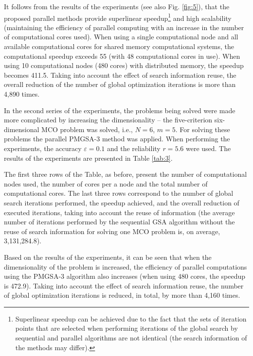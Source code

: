 \documentclass[review]{elsarticle}
\begin{document}
It follows from the results of the experiments (see also Fig. \ref{fig:5}), that the proposed parallel methods provide superlinear speedup\footnote{Superlinear speedup can be achieved due to the fact that the sets of iteration points that are selected when performing iterations of the global search by sequential and parallel algorithms are not identical (the search information of the methods may differ).} and high scalability (maintaining the efficiency of parallel computing with an increase in the number of computational cores used). When using a single computational node and all available computational cores for shared memory computational systems, the computational speedup exceeds 55 (with 48 computational cores in use). When using 10 computational nodes (480 cores) with distributed memory, the speedup becomes 411.5. Taking into account the effect of search information reuse, the overall reduction of the number of global optimization iterations is more than 4,890 times.

In the second series of the experiments, the problems being solved were made more complicated by increasing the dimensionality -- the five-criterion six-dimensional MCO problem was solved, i.e., $N = 6$, $m = 5$. For solving these problems the parallel PMGSA-3 method was applied. When performing the experiments, the accuracy $\varepsilon = 0.1$ and the reliability $r = 5.6$ were used. The results of the experiments are presented in Table \ref{tab:3}.

The first three rows of the Table, as before, present the number of computational nodes used, the number of cores per a node and the total number of computational cores. The last three rows correspond to the number of global search iterations performed, the speedup achieved, and the overall reduction of executed iterations, taking into account the reuse of information (the average number of iterations performed by the sequential GSA algorithm without the reuse of search information for solving one MCO problem is, on average, 3,131,284.8).

Based on the results of the experiments, it can be seen that when the dimensionality of the problem is increased, the efficiency of parallel computations using the PMGSA-3 algorithm also increases (when using 480 cores, the speedup is 472.9). Taking into account the effect of search information reuse, the number of global optimization iterations is reduced, in total, by more than 4,160 times.
\end{document}

